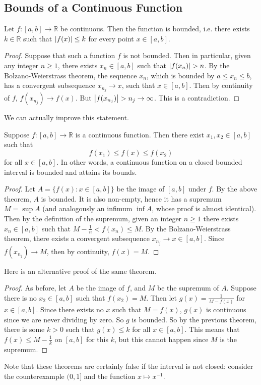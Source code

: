 \subsection{Bounds of a Continuous Function}
\begin{theorem}
	Let \(f \colon [a, b] \to \mathbb R\) be continuous. Then the function is bounded, i.e. there exists \(k \in \mathbb R\) such that \(\abs{f(x)} \leq k\) for every point \(x \in [a, b]\).
\end{theorem}
\begin{proof}
	Suppose that such a function \(f\) is not bounded. Then in particular, given any integer \(n \geq 1\), there exists \(x_n \in [a, b]\) such that \(\abs{f(x_n)} > n\). By the Bolzano-Weierstrass theorem, the sequence \(x_n\), which is bounded by \(a \leq x_n \leq b\), has a convergent subsequence \(x_{n_j} \to x\), such that \(x \in [a, b]\). Then by continuity of \(f\), \(f(x_{n_j}) \to f(x)\). But \(\abs{f(x_{n_j})} > n_j \to \infty\). This is a contradiction.
\end{proof}
\noindent We can actually improve this statement.
\begin{theorem}
	Suppose \(f \colon [a, b] \to \mathbb R\) is a continuous function. Then there exist \(x_1, x_2 \in [a, b]\) such that
	\[ f(x_1) \leq f(x) \leq f(x_2) \]
	for all \(x \in [a, b]\). In other words, a continuous function on a closed bounded interval is bounded and attains its bounds.
\end{theorem}
\begin{proof}
	Let \(A = \{ f(x) \colon x \in [a, b] \}\) be the image of \([a, b]\) under \(f\). By the above theorem, \(A\) is bounded. It is also non-empty, hence it has a supremum \(M = \sup A\) (and analogously an infimum \(\inf A\), whose proof is almost identical). Then by the definition of the supremum, given an integer \(n \geq 1\) there exists \(x_n \in [a, b]\) such that \(M - \frac{1}{n} < f(x_n) \leq M\). By the Bolzano-Weierstrass theorem, there exists a convergent subsequence \(x_{n_j} \to x \in [a, b]\). Since \(f(x_{n_j}) \to M\), then by continuity, \(f(x) = M\).
\end{proof}
\noindent Here is an alternative proof of the same theorem.
\begin{proof}
	As before, let \(A\) be the image of \(f\), and \(M\) be the supremum of \(A\). Suppose there is no \(x_2 \in [a, b]\) such that \(f(x_2) = M\). Then let \(g(x) = \frac{1}{M - f(x)}\) for \(x \in [a, b]\). Since there exists no \(x\) such that \(M = f(x)\), \(g(x)\) is continuous since we are never dividing by zero. So \(g\) is bounded. So by the previous theorem, there is some \(k > 0\) such that \(g(x) \leq k\) for all \(x \in [a, b]\). This means that \(f(x) \leq M - \frac{1}{k}\) on \([a, b]\) for this \(k\), but this cannot happen since \(M\) is the supremum.
\end{proof}
\noindent Note that these theorems are certainly false if the interval is not closed: consider the counterexample \((0, 1]\) and the function \(x \mapsto x^{-1}\).

